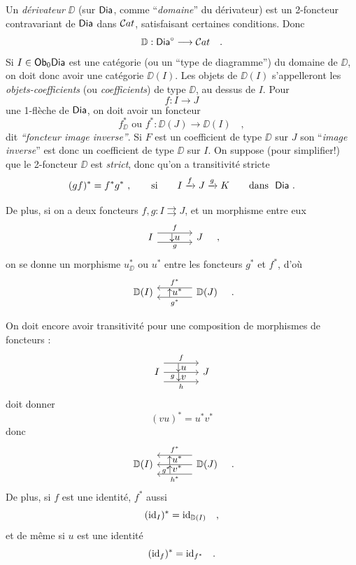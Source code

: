 Un \textit{dérivateur} $\DD$ (sur $\mathsf{Dia}$, comme “\textit{domaine}” du dérivateur) est un 2-foncteur contravariant de $\mathsf{Dia}$ dans $\mathcal{C}at$, satisfaisant certaines conditions. Donc
\[ \mathbb{D} : \mathsf{Dia}^{\circ} \longrightarrow \mathcal{C}at \quad . \]
Si $I \in \mathsf{Ob}_0 \mathsf{Dia}$ est une catégorie (ou un “type de diagramme”) du domaine de $\DD$, on doit donc avoir une catégorie $\DD(I)$. Les objets de $\DD(I)$ s'appelleront les \textit{objets-coefficients} (ou \textit{coefficients}) de type $\DD$, au dessus de $I$. Pour
\[ f : I \longrightarrow J \]
une 1-flèche de $\mathsf{Dia}$, on doit avoir un foncteur
\[ f^*_{\DD} \text{ ou } f^* : \DD(J) \longrightarrow \DD(I) \quad , \]
dit \textit{“foncteur image inverse”}. Si $F$ est un coefficient de type $\DD$ sur $J$ son “\textit{image inverse}” est donc un coefficient de type $\DD$ sur $I$. On suppose (pour simplifier!) que le 2-foncteur $\DD$ est \textit{strict}, donc qu'on a transitivité stricte
\[ (gf)^* = f^*g^* \ , \qquad \text{si} \qquad I \xrightarrow{f} J \xrightarrow{g} K \qquad \text{dans} \ \ \Dia \ . \]


De plus, si on a deux foncteurs $f, g : I \rightrightarrows J$, et un morphisme entre eux
\[
\begin{tikzcd}[column sep=large]
I \arrow[r, shift left=2, "f"] \arrow[r, shift right=2, "g"'] \arrow[r, phantom, "{\downarrow}u"] & J
\end{tikzcd}
\quad ,
\]
on se donne un morphisme $u^*_{\DD}$ ou $u^*$ entre les foncteurs $g^*$ et $f^*$, d'où
\[
\begin{tikzcd}[column sep=large]
\DD(I) & \DD(J) \arrow[l, shift right=2, "f^*"'] \arrow[l, shift left=2, "g^*"] \arrow[l, phantom, "{\uparrow}u^*"]
\end{tikzcd}
\quad .
\]


On doit encore avoir transitivité pour une composition de morphismes de foncteurs :
\[
\begin{tikzcd}[column sep=large]
I \arrow[r, shift left=4, "f"] \arrow[r, "g"' near start] \arrow[r, shift right=4, "h"'] \arrow[r, phantom, shift left=2, "{\downarrow}u"] \arrow[r, phantom, shift right=2, "{\downarrow}v"] & J
\end{tikzcd}
\]
doit donner
\[ (vu)^* = u^*v^* \]
donc
\[
\begin{tikzcd}[column sep=large]
\DD(I) & \DD(J) \arrow[l, shift right=4, "f^*"'] \arrow[l, "g^*" near end] \arrow[l, shift left=4, "h^*"] \arrow[l, phantom, shift right=2, "{\uparrow}u^*"] \arrow[l, phantom, shift left=2, "{\uparrow}v^*"]
\end{tikzcd}
\quad .
\]
De plus, si $f$ est une identité, $f^*$ aussi
\[ (\mathrm{id}_I)^* = \mathrm{id}_{\mathbb{D}(I)} \quad , \]
et de même si $u$ est une identité
\[ (\mathrm{id}_f)^* = \mathrm{id}_{f^*} \quad . \]

